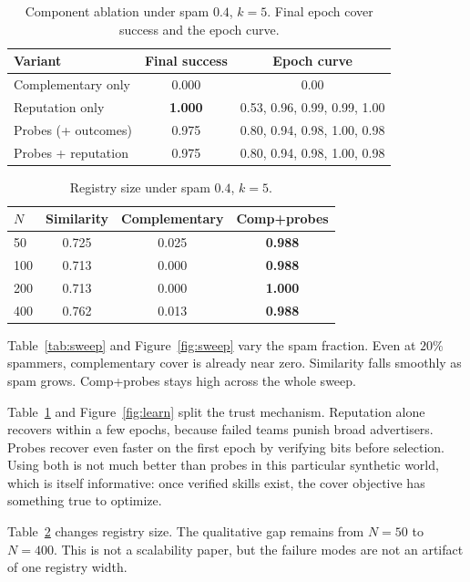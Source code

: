 \documentclass{article}
\begin{document}
\begin{table}[t]
\centering
\caption{Component ablation under spam $0.4$, $k{=}5$.
Final epoch cover success and the epoch curve.}
\label{tab:ablate}
\footnotesize
\begin{tabular}{lcc}
\toprule
Variant & Final success & Epoch curve \\
\midrule
Complementary only & 0.000 & 0.00 \\
Reputation only & \textbf{1.000} & 0.53, 0.96, 0.99, 0.99, 1.00 \\
Probes (+ outcomes) & 0.975 & 0.80, 0.94, 0.98, 1.00, 0.98 \\
Probes + reputation & 0.975 & 0.80, 0.94, 0.98, 1.00, 0.98 \\
\bottomrule
\end{tabular}
\end{table}

\begin{table}[t]
\centering
\caption{Registry size under spam $0.4$, $k{=}5$.}
\label{tab:scale}
\footnotesize
\begin{tabular}{lccc}
\toprule
$N$ & Similarity & Complementary & Comp+probes \\
\midrule
50 & 0.725 & 0.025 & \textbf{0.988} \\
100 & 0.713 & 0.000 & \textbf{0.988} \\
200 & 0.713 & 0.000 & \textbf{1.000} \\
400 & 0.762 & 0.013 & \textbf{0.988} \\
\bottomrule
\end{tabular}
\end{table}

Table~\ref{tab:sweep} and Figure~\ref{fig:sweep} vary the spam fraction.
Even at $20\%$ spammers, complementary cover is already near zero.
Similarity falls smoothly as spam grows.
Comp+probes stays high across the whole sweep.

Table~\ref{tab:ablate} and Figure~\ref{fig:learn} split the trust mechanism.
Reputation alone recovers within a few epochs, because failed teams punish broad advertisers.
Probes recover even faster on the first epoch by verifying bits before selection.
Using both is not much better than probes in this particular synthetic world, which is itself informative: once verified skills exist, the cover objective has something true to optimize.

Table~\ref{tab:scale} changes registry size.
The qualitative gap remains from $N{=}50$ to $N{=}400$.
This is not a scalability paper, but the failure modes are not an artifact of one registry width.
\end{document}

